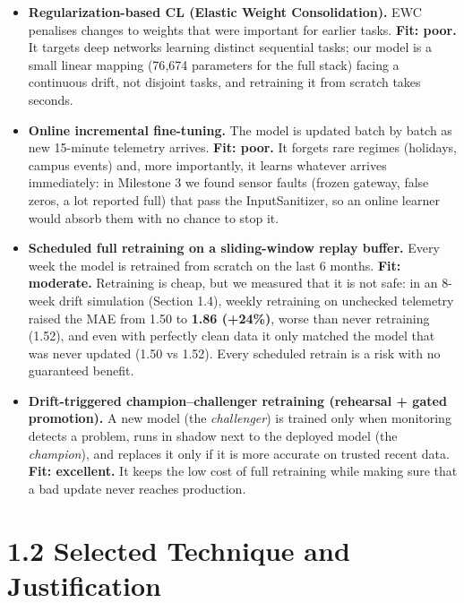 \documentclass[11pt,letterpaper]{article}
\begin{document}
\begin{itemize}
  \item \textbf{Regularization-based CL (Elastic Weight Consolidation).} EWC penalises changes to weights that were
  important for earlier tasks. \textbf{Fit: poor.} It targets deep networks learning distinct sequential tasks; our
  model is a small linear mapping (76{,}674 parameters for the full stack) facing a continuous drift, not disjoint
  tasks, and retraining it from scratch takes seconds.

  \item \textbf{Online incremental fine-tuning.} The model is updated batch by batch as new 15-minute telemetry arrives.
  \textbf{Fit: poor.} It forgets rare regimes (holidays, campus events) and, more importantly, it learns whatever
  arrives immediately: in Milestone 3 we found sensor faults (frozen gateway, false zeros, a lot reported full) that
  pass the InputSanitizer, so an online learner would absorb them with no chance to stop it.

  \item \textbf{Scheduled full retraining on a sliding-window replay buffer.} Every week the model is retrained from
  scratch on the last 6 months. \textbf{Fit: moderate.} Retraining is cheap, but we measured that it is not safe: in an
  8-week drift simulation (Section 1.4), weekly retraining on unchecked telemetry raised the MAE from 1.50 to
  \textbf{1.86 (+24\%)}, worse than never retraining (1.52), and even with perfectly clean data it only matched the
  model that was never updated (1.50 vs 1.52). Every scheduled retrain is a risk with no guaranteed benefit.

  \item \textbf{Drift-triggered champion--challenger retraining (rehearsal + gated promotion).} A new model (the
  \emph{challenger}) is trained only when monitoring detects a problem, runs in shadow next to the deployed model (the
  \emph{champion}), and replaces it only if it is more accurate on trusted recent data. \textbf{Fit: excellent.} It keeps
  the low cost of full retraining while making sure that a bad update never reaches production.
\end{itemize}

\section*{1.2 Selected Technique and Justification}
\end{document}
